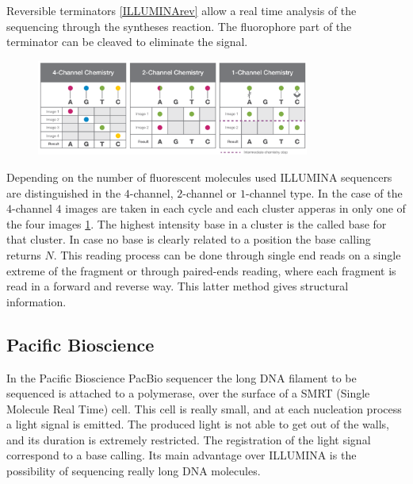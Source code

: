         Reversible terminators \ref{ILLUMINArev} allow a real time analysis of the sequencing through the syntheses reaction.
        The fluorophore part of the terminator can be cleaved to eliminate the signal.

        \begin{figure}[h]
        \caption{}
        \centering
        \includegraphics[width=0.8\textwidth]{ChannelILLUMINA}
        \label{ChannelILLUMINA}
        \end{figure}

        Depending on the number of fluorescent molecules used ILLUMINA sequencers are distinguished in the $4$-channel, $2$-channel or $1$-channel type.
        In the case of the $4$-channel $4$ images are taken in each cycle and each cluster apperas in only one of the four images \ref{ChannelILLUMINA}.
        The highest intensity base in a cluster is the called base for that cluster.
        In case no base is clearly related to a position the base calling returns $N$.
        This reading process can be done through single end reads on a single extreme of the fragment or through paired-ends reading, where each fragment is read in a forward and reverse way.
        This latter method gives structural information.

    \subsection{Pacific Bioscience}
    In the Pacific Bioscience PacBio sequencer the long DNA filament to be sequenced is attached to a polymerase, over the surface of a SMRT (Single Molecule Real Time) cell.
    This cell is really small, and at each nucleation process a light signal is emitted.
    The produced light is not able to get out of the walls, and its duration is extremely restricted.
    The registration of the light signal correspond to a base calling.
    Its main advantage over ILLUMINA is the possibility of sequencing really long DNA molecules.

